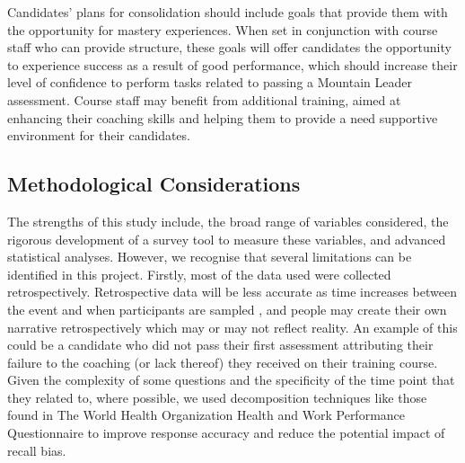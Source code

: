 \documentclass[
  12pt,
  a4paper,
]{book}
\begin{document}
Candidates' plans for consolidation should include goals that provide them with the opportunity for mastery experiences. When set in conjunction with course staff who can provide structure, these goals will offer candidates the opportunity to experience success as a result of good performance, which should increase their level of confidence to perform tasks related to passing a Mountain Leader assessment. Course staff may benefit from additional training, aimed at enhancing their coaching skills and helping them to provide a need supportive environment for their candidates.

\hypertarget{methodological-considerations}{%
\subsection{Methodological Considerations}\label{methodological-considerations}}

The strengths of this study include, the broad range of variables considered, the rigorous development of a survey tool to measure these variables, and advanced statistical analyses. However, we recognise that several limitations can be identified in this project. Firstly, most of the data used were collected retrospectively. Retrospective data will be less accurate as time increases between the event and when participants are sampled \citep{Hopwood2013}, and people may create their own narrative retrospectively which may or may not reflect reality. An example of this could be a candidate who did not pass their first assessment attributing their failure to the coaching (or lack thereof) they received on their training course. Given the complexity of some questions and the specificity of the time point that they related to, where possible, we used decomposition techniques like those found in The World Health Organization Health and Work Performance Questionnaire \citep[HPQ;][]{Kessler2003a} to improve response accuracy and reduce the potential impact of recall bias.
\end{document}
